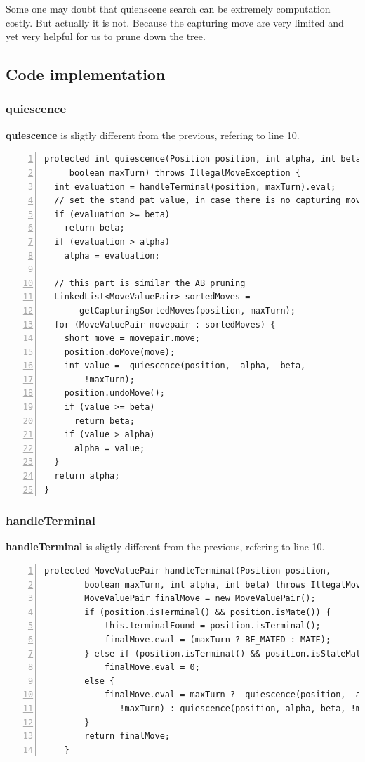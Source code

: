 \documentclass{article}
\begin{document}
Some one may doubt that quienscene search can be extremely computation costly. But actually it is not. Because the capturing move are very limited and yet very helpful for us to prune down the tree.


\subsection{Code implementation}

\subsubsection{quiescence}

\textbf{quiescence} is sligtly different from the previous, refering to line 10.

\begin{lstlisting}[numbers=left]
protected int quiescence(Position position, int alpha, int beta,
     boolean maxTurn) throws IllegalMoveException {
  int evaluation = handleTerminal(position, maxTurn).eval;
  // set the stand pat value, in case there is no capturing move
  if (evaluation >= beta)
    return beta;
  if (evaluation > alpha)
    alpha = evaluation;

  // this part is similar the AB pruning
  LinkedList<MoveValuePair> sortedMoves =
       getCapturingSortedMoves(position, maxTurn);
  for (MoveValuePair movepair : sortedMoves) {
    short move = movepair.move;
    position.doMove(move);
    int value = -quiescence(position, -alpha, -beta,
        !maxTurn);
    position.undoMove();
    if (value >= beta)
      return beta;
    if (value > alpha)
      alpha = value;
  }
  return alpha;
}
\end{lstlisting}


\subsubsection{handleTerminal}

\textbf{handleTerminal} is sligtly different from the previous, refering to line 10.

\begin{lstlisting}[numbers=left]
    protected MoveValuePair handleTerminal(Position position, 
        boolean maxTurn, int alpha, int beta) throws IllegalMoveException {
        MoveValuePair finalMove = new MoveValuePair();
        if (position.isTerminal() && position.isMate()) {
            this.terminalFound = position.isTerminal();
            finalMove.eval = (maxTurn ? BE_MATED : MATE);
        } else if (position.isTerminal() && position.isStaleMate())
            finalMove.eval = 0;
        else {
            finalMove.eval = maxTurn ? -quiescence(position, -alpha, -beta, 
               !maxTurn) : quiescence(position, alpha, beta, !maxTurn);
        }
        return finalMove;
    }

\end{lstlisting}
\end{document}
